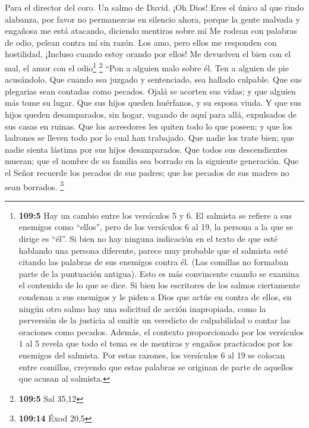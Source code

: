 Para el director del coro. Un salmo de David.  ¡Oh Dios!
Eres el único al que rindo alabanza, por favor no permanezcas en
silencio ahora,  porque la gente malvada y engañosa me
está atacando, diciendo mentiras sobre mí  Me rodean con
palabras de odio, pelean contra mí sin razón.  Los amo,
pero ellos me responden con hostilidad, ¡Incluso cuando estoy orando por
ellos!  Me devuelven el bien con el mal, el amor con el
odio\footnote{\textbf{109:5} Hay un cambio entre los versículos 5 y 6.
  El salmista se refiere a sus enemigos como ``ellos'', pero de los
  versículos 6 al 19, la persona a la que se dirige es ``él''. Si bien
  no hay ninguna indicación en el texto de que esté hablando una persona
  diferente, parece muy probable que el salmista esté citando las
  palabras de sus enemigos contra él. (Las comillas no formaban parte de
  la puntuación antigua). Esto es más convincente cuando se examina el
  contenido de lo que se dice. Si bien los escritores de los salmos
  ciertamente condenan a sus enemigos y le piden a Dios que actúe en
  contra de ellos, en ningún otro salmo hay una solicitud de acción
  inapropiada, como la perversión de la justicia al emitir un veredicto
  de culpabilidad o contar las oraciones como pecados. Además, el
  contexto proporcionado por los versículos 1 al 5 revela que todo el
  tema es de mentiras y engaños practicados por los enemigos del
  salmista. Por estas razones, los versículos 6 al 19 se colocan entre
  comillas, creyendo que estas palabras se originan de parte de aquellos
  que acusan al salmista.} \footnote{\textbf{109:5} Sal 35,12}
 ``Pon a alguien malo sobre él. Ten a alguien de pie
acusándolo.  Que cuando sea juzgado y sentenciado, sea
hallado culpable. Que sus plegarias sean contadas como pecados.
 Ojalá se acorten sus vidas; y que alguien más tome su
lugar.  Que sus hijos queden huérfanos, y su esposa viuda.
 Y que sus hijos queden desamparados, sin hogar, vagando
de aquí para allá, expulsados de sus casas en ruinas. 
Que los acreedores les quiten todo lo que poseen; y que los ladrones se
lleven todo por lo cual han trabajado.  Que nadie los
trate bien; que nadie sienta lástima por sus hijos desamparados.
 Que todos sus descendientes mueran; que el nombre de su
familia sea borrado en la siguiente generación.  Que el
Señor recuerde los pecados de sus padres; que los pecados de sus madres
no sean borrados. \footnote{\textbf{109:14} Éxod 20,5} 
